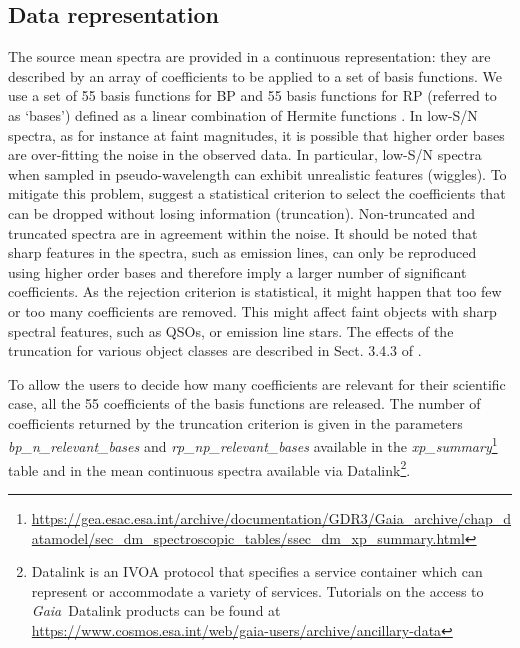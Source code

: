 \documentclass[longauth]{aa}
\makeatletter
\newcommand\gaia{\textit{Gaia}\xspace}
\providecommand{\linktodoc}{https://gea.esac.esa.int/archive/documentation/GDR3}
\providecommand{\phottable}[1]{\url{\linktodoc/Gaia_archive/chap_datamodel/sec_dm_spectroscopic_tables/ssec_dm_#1.html}}%
\DeclareRobustCommand*{\fieldName}[1]{%
  \begingroup\@fieldName\scantokens{\texttt{\small {#1}}\noexpand}\endgroup}
\makeatother
\begin{document}
\subsection{Data representation}
The source mean spectra are provided in a continuous representation: they are described by an array of coefficients to be applied to a set of basis functions. We use a set of 55 basis functions for BP and  55  basis functions for RP (referred to as `bases') defined as a linear combination of Hermite functions \citep{EDR3-DPACP-119, EDR3-DPACP-118}. 
In low-S/N spectra, as for instance  at faint magnitudes, it is possible that higher order bases  are over-fitting the noise in the observed data. In particular, low-S/N spectra when sampled in pseudo-wavelength can exhibit unrealistic features (wiggles).
To mitigate this problem,
\citet{EDR3-DPACP-119} suggest a statistical criterion to select the coefficients that can be dropped without losing information (truncation). Non-truncated and truncated spectra are in agreement within the noise. 
It should be noted that sharp features in the spectra, such as emission lines, can only be reproduced using higher order bases and therefore imply a larger number of significant coefficients. As the rejection criterion is statistical, it might happen that too few or too many coefficients are removed. This might affect faint objects with sharp spectral features, such as QSOs, or emission line stars.  The effects of the truncation for various object classes are described in Sect. 3.4.3 of \citet{EDR3-DPACP-118}.

To allow the users to decide how many coefficients are relevant for their scientific case,  all the 55 coefficients of the basis functions are released. The number of coefficients returned by the truncation criterion  is given in the parameters \textit{bp\_n\_relevant\_bases}
and \textit{rp\_np\_relevant\_bases}
available in the \textit{xp\_summary}\footnote{\phottable{xp_summary}} %
table and
in the mean continuous spectra available via Datalink\footnote{Datalink is an IVOA protocol that specifies a service container which can represent or accommodate a variety of services. Tutorials on the access to \gaia\ Datalink products can be found at {\url{https://www.cosmos.esa.int/web/gaia-users/archive/ancillary-data}}}.
\end{document}
